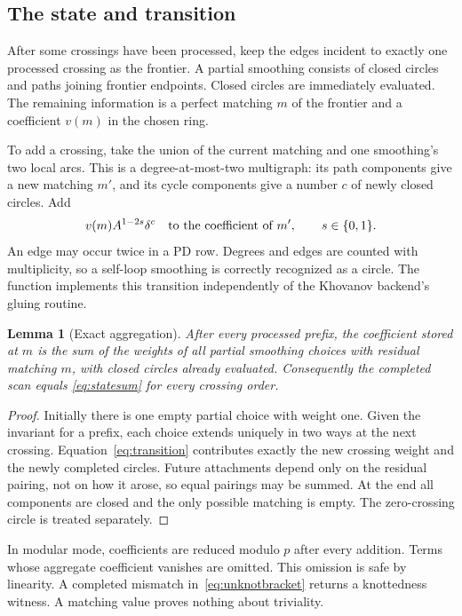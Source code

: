 \documentclass[11pt]{article}
\newtheorem{lemma}[theorem]{Lemma}
\theoremstyle{remark}\newtheorem{remark}[theorem]{Remark}
\newcommand{\code}[1]{\texttt{\detokenize{#1}}}
\begin{document}
\subsection{The state and transition}
After some crossings have been processed, keep the edges incident to exactly
one processed crossing as the frontier. A partial smoothing consists of
closed circles and paths joining frontier endpoints. Closed circles are
immediately evaluated. The remaining information is a perfect matching $m$
of the frontier and a coefficient $v(m)$ in the chosen ring.

To add a crossing, take the union of the current matching and one smoothing's
two local arcs. This is a degree-at-most-two multigraph: its path components
give a new matching $m'$, and its cycle components give a number $c$ of newly
closed circles. Add
\begin{equation}
 v(m)A^{1-2s}\delta^c
 \quad\hbox{to the coefficient of }m',\qquad s\in\{0,1\}.
 \label{eq:transition}
\end{equation}
An edge may occur twice in a PD row. Degrees and edges are counted with
multiplicity, so a self-loop smoothing is correctly recognized as a circle.
The function \code{attach} implements this transition independently of the
Khovanov backend's gluing routine.

\begin{lemma}[Exact aggregation]
After every processed prefix, the coefficient stored at $m$ is the sum of the
weights of all partial smoothing choices with residual matching $m$, with
closed circles already evaluated. Consequently the completed scan equals
\eqref{eq:statesum} for every crossing order.
\end{lemma}
\begin{proof}
Initially there is one empty partial choice with weight one. Given the
invariant for a prefix, each choice extends uniquely in two ways at the next
crossing. Equation~\eqref{eq:transition} contributes exactly the new crossing
weight and the newly completed circles. Future attachments depend only on the
residual pairing, not on how it arose, so equal pairings may be summed.
At the end all components are closed and the only possible matching is empty.
The zero-crossing circle is treated separately.
\end{proof}

In modular mode, coefficients are reduced modulo $p$ after every addition.
Terms whose aggregate coefficient vanishes are omitted. This omission is safe
by linearity. A completed mismatch in~\eqref{eq:unknotbracket} returns a
knottedness witness. A matching value proves nothing about triviality.
\end{document}
